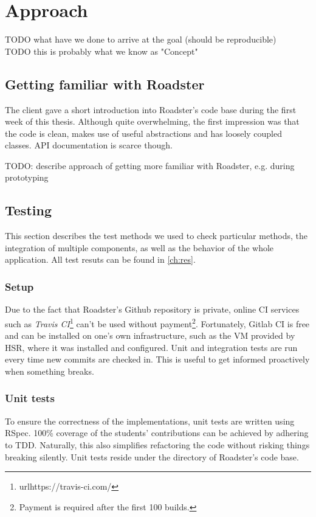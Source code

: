 \chapter{Approach}
TODO what have we done to arrive at the goal (should be reproducible)\\
TODO this is probably what we know as "Concept"\\


\section{Getting familiar with Roadster}
The client gave a short introduction into Roadster's code base during the first
week of this thesis. Although quite overwhelming, the first impression was that
the code is clean, makes use of useful abstractions and has loosely coupled
classes. API documentation is scarce though.

TODO: describe approach of getting more familiar with Roadster, e.g. during prototyping

\section{Testing}
This section describes the test methods we used to check particular methods,
the integration of multiple components, as well as the behavior of the whole application.
All test resuts can be found in \autoref{ch:res}.

\subsection{Setup}
Due to the fact that Roadster's Github repository is private, online \gls{CI}
services such as \emph{Travis
CI}\footnote{url{https://travis-ci.com/}} can't be used without
payment\footnote{Payment is required after the first 100 builds.}. Fortunately,
Gitlab CI is free and can be installed on one's own infrastructure, such as the
\gls{VM} provided by HSR, where it was installed and configured. Unit and
integration tests are run every time new commits are checked in. This is useful
to get informed proactively when something breaks.

\subsection{Unit tests}
To ensure the correctness of the implementations, unit tests are written using
RSpec. 100\% coverage of the students' contributions can be achieved by
adhering to \gls{TDD}. Naturally, this also simplifies refactoring the code
without risking things breaking silently. Unit tests reside under the 
directory of Roadster's code base.

